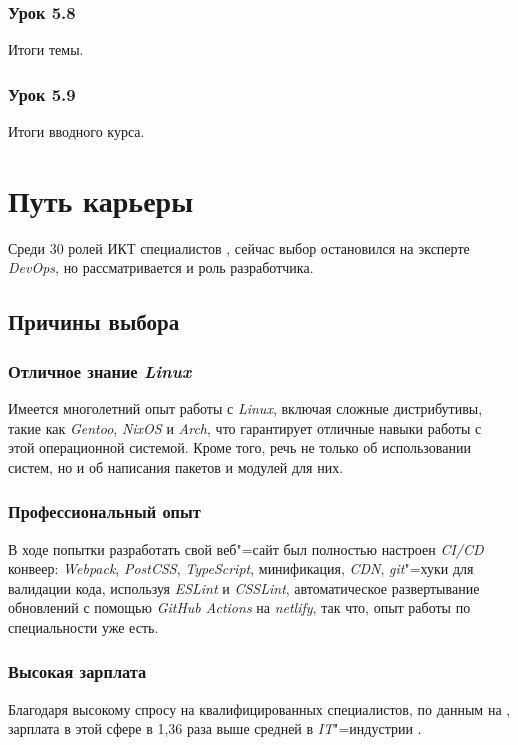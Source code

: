 \documentclass[variant=practice]{bsuir}
\begin{document}
\subsection{Урок 5.8} Итоги темы.

\subsection{Урок 5.9} Итоги вводного курса.

\chapter{Путь карьеры}

Среди 30 ролей ИКТ специалистов \cite{majors}, сейчас выбор остановился на
эксперте \textit{DevOps}, но рассматривается и роль разработчика.

\section{Причины выбора}

\subsection{Отличное знание \textit{Linux}} Имеется многолетний опыт работы с
\textit{Linux}, включая сложные дистрибутивы, такие как \textit{Gentoo},
\textit{NixOS} и \textit{Arch}, что гарантирует отличные навыки работы с этой
операционной системой. Кроме того, речь не только об использовании систем, но и
об написания пакетов и модулей для них.

\subsection{Профессиональный опыт} В ходе попытки разработать свой веб"=сайт был
полностью настроен \textit{CI/CD} конвеер: \textit{Webpack}, \textit{PostCSS},
\textit{TypeScript}, минификация, \textit{CDN}, \textit{git}"=хуки для валидации
кода, используя \textit{ESLint} и \textit{CSSLint}, автоматическое развертывание
обновлений с помощью \textit{GitHub Actions} на \textit{netlify}, так что, опыт
работы по специальности уже есть.

\subsection{Высокая зарплата} Благодаря высокому спросу на квалифицированных
специалистов, по данным на  \cite{devops-habr}, зарплата
в этой сфере в 1,36 раза выше средней в \textit{IT}"=индустрии \cite{devops-mts}.
\end{document}
